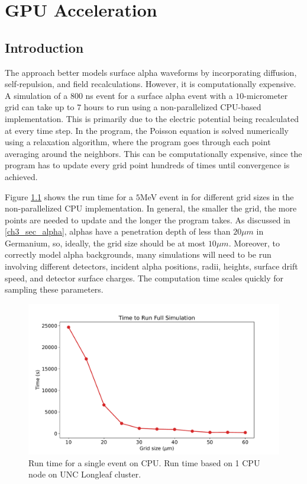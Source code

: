 \chapter{GPU Acceleration}
\label{chap4:gpu}

\section{Introduction}
The {\ehd} approach better models surface alpha waveforms by incorporating diffusion, self-repulsion, and field recalculations. However, it is computationally expensive. A simulation of a $800$ ns event for a surface alpha event with a $10$-micrometer grid can take up to $7$ hours to run using a non-parallelized CPU-based implementation. This is primarily due to the electric potential being recalculated at every time step. In the program, the Poisson equation is solved numerically using a relaxation algorithm, where the program goes through each point averaging around the neighbors. This can be computationally expensive, since the program has to update every grid point hundreds of times until convergence is achieved. 

Figure \ref{fig:CPU_time} shows the run time for a $5$MeV event in {\ehd} for different grid sizes in the non-parallelized CPU implementation. In general, the smaller the grid, the more points are needed to update and the longer the program takes. As discussed in \ref{ch3_sec_alpha}, alphas have a penetration depth of less than $20 \mu m$ in Germanium, so, ideally, the grid size should be at most $10 \mu m$. Moreover, to correctly model alpha backgrounds, many simulations will need to be run involving different detectors, incident alpha positions, radii, heights, surface drift speed, and detector surface charges. The computation time scales quickly for sampling these parameters.

\begin{figure}
\centering
 \includegraphics[width=0.99\linewidth]{ch4/figs/cpu_run_time.pdf}
\caption{Run time for a single {\ehd} event on CPU. Run time based on 1 CPU node on UNC Longleaf cluster.}
\label{fig:CPU_time}
\end{figure}


